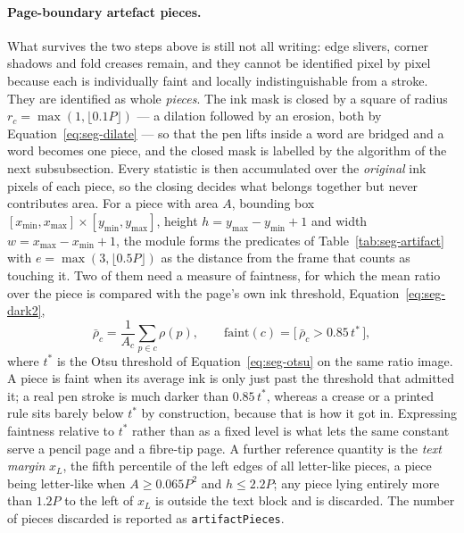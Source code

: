 \paragraph{Page-boundary artefact pieces.}
What survives the two steps above is still not all writing: edge slivers, corner shadows and fold creases remain, and they cannot be identified pixel by pixel because each is individually faint and locally indistinguishable from a stroke.
They are identified as whole \emph{pieces}.
The ink mask is closed by a square of radius $r_c=\max(1,\lfloor0.1P\rfloor)$ --- a dilation followed by an erosion, both by Equation~\ref{eq:seg-dilate} --- so that the pen lifts inside a word are bridged and a word becomes one piece, and the closed mask is labelled by the algorithm of the next subsubsection.
Every statistic is then accumulated over the \emph{original} ink pixels of each piece, so the closing decides what belongs together but never contributes area.
For a piece with area $A$, bounding box $[x_{\min},x_{\max}]\times[y_{\min},y_{\max}]$, height $h=y_{\max}-y_{\min}+1$ and width $w=x_{\max}-x_{\min}+1$, the module forms the predicates of Table~\ref{tab:seg-artifact} with $e=\max(3,\lfloor0.5P\rfloor)$ as the distance from the frame that counts as touching it.
Two of them need a measure of faintness, for which the mean ratio over the piece is compared with the page's own ink threshold, Equation~\ref{eq:seg-dark2},
\begin{equation}
\bar\rho_c=\frac{1}{A_c}\sum_{p\in c}\rho(p),\qquad \mathrm{faint}(c)=\bigl[\,\bar\rho_c>0.85\,t^*\,\bigr],
\label{eq:seg-dark2}
\end{equation}
where $t^*$ is the Otsu threshold of Equation~\ref{eq:seg-otsu} on the same ratio image.
A piece is faint when its average ink is only just past the threshold that admitted it; a real pen stroke is much darker than $0.85\,t^*$, whereas a crease or a printed rule sits barely below $t^*$ by construction, because that is how it got in.
Expressing faintness relative to $t^*$ rather than as a fixed level is what lets the same constant serve a pencil page and a fibre-tip page.
A further reference quantity is the \emph{text margin} $x_L$, the fifth percentile of the left edges of all letter-like pieces, a piece being letter-like when $A\ge0.065P^2$ and $h\le2.2P$; any piece lying entirely more than $1.2P$ to the left of $x_L$ is outside the text block and is discarded.
The number of pieces discarded is reported as \texttt{artifactPieces}.

